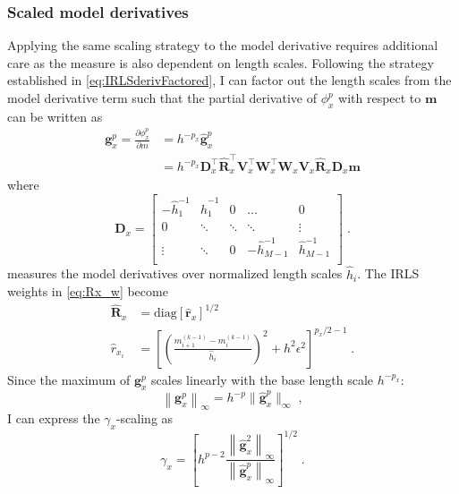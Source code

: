 \subsubsection{Scaled model derivatives}
Applying the same scaling strategy to the model derivative requires additional care as the measure is also dependent on length scales.
Following the strategy established in \eqref{eq:IRLSderivFactored}, I can factor out the length scales from the model derivative term such that the partial derivative of $\phi_x^p$ with respect to $\mathbf{m}$ can be written as
\begin{equation}\label{gxlp}
\begin{split}
\mathbf{g}_x^{p} = \frac{\partial \phi_x^{p}}{\partial {m}} &=  h^{-p_x} \mathbf{\hat g}_x^{p}\\
& = h^{-p_x}  \mathbf{D}^\top_{x}  \mathbf{\hat R}^\top_{x} \mathbf{V}^\top_{x} \mathbf{W}^\top_{x} \mathbf{W}_{x} \mathbf{V}_{x} \mathbf{\hat R}_{x} \mathbf{D}_x \mathbf{m} 
\end{split}
\end{equation}
where
\begin{equation}\label{finiteDifference}
\mathbf{D}_x = 		\begin{bmatrix}
			-\hat h_1^{-1}		& 		\hat h_1^{-1}	& 	0		& \dots 		& 0 \\
			0 		& 	\ddots	& 	 \ddots	& \ddots 	& \vdots \\
			\vdots	& 		 \ddots	& 0	& -\hat h^{-1}_{{M-1}} & \hat h^{-1}_{{M-1}}\\
		 \end{bmatrix}\;.
\end{equation} 
measures the model derivatives over normalized length scales $\hat h_i$.   
The IRLS weights in \eqref{eq:Rx_w} become
\begin{equation}
\begin{split}
	\mathbf{\hat R}_x &=  \text{diag} \left[\mathbf{ \hat r}_x \right]^{1/2} \\
	\hat r_{x_i} &=\left[ \left(\frac{m^{(k-1)}_{i+1} - m^{(k-1)}_i}{\hat h_i}\right)^{2} + h^2\epsilon^2\right]^{p_x/2 - 1}\;.
\end{split}
\end{equation}
Since the maximum of $\mathbf{g}_x^{p}$ scales linearly with the base length scale $h^{-p_x}$:
\begin{equation}
\left\|\mathbf{g}_x^{p}\right\|_\infty = h^{-p}\|\mathbf{\hat g}_x^{p}\|_\infty \;,
\end{equation}
I can express the $\gamma_x$-scaling as
\begin{equation} \label{gamma_x_nonscaled}
\gamma_x = \left[h^{p-2}\frac{ \left\| \mathbf{\hat g}_x^2 \right\|_\infty}{\left\|\mathbf{\hat g}_x^{p}\right\|_\infty}\right]^{1/2} \;.
\end{equation} 
